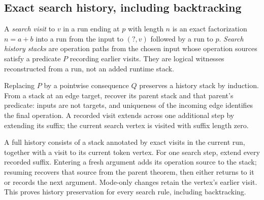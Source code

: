 
\subsection{Exact search history, including backtracking}

A \emph{search visit} to $v$ in a run ending at $p$ with length $n$ is an exact
factorization $n=a+b$ into a run from the input to $(?,v)$ followed by a run
to $p$. \emph{Search history stacks} are operation paths from the chosen input
whose operation sources satisfy a predicate $P$ recording earlier visits.
They are logical witnesses reconstructed from a run, not an added runtime
stack.



Replacing $P$ by a pointwise consequence $Q$ preserves a history stack by
induction. From a stack at an edge target, recover its parent stack and that
parent's predicate: inputs are not targets, and uniqueness of the incoming
edge identifies the final operation. A recorded visit extends across one
additional step by extending its suffix; the current search vertex is visited
with suffix length zero.





A full history consists of a stack annotated by exact visits in the current
run, together with a visit to its current token vertex. For one search step,
extend every recorded suffix. Entering a fresh argument adds its operation
source to the stack; resuming recovers that source from the parent theorem,
then either returns to it or records the next argument. Mode-only changes
retain the vertex's earlier visit. This proves history preservation for every
search rule, including backtracking.



